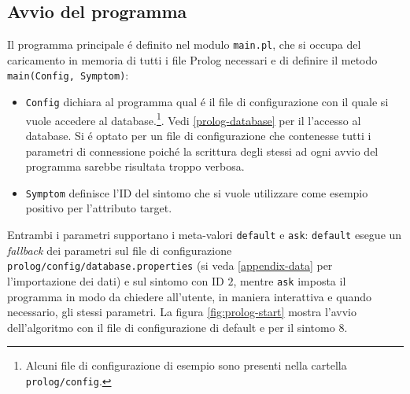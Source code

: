 \documentclass[preprint]{acm_proc_article-sp}
\begin{document}
\subsection{Avvio del programma}
\label{prolog-main}
Il programma principale \'e definito nel modulo \verb|main.pl|, che si occupa del caricamento in memoria di tutti i file Prolog necessari e di definire il metodo \verb|main(Config, Symptom)|:
\begin{itemize}
\item \verb|Config| dichiara al programma qual \'e il file di configurazione con il quale si vuole accedere al database.\footnote{Alcuni file di configurazione di esempio sono presenti nella cartella \texttt{prolog/config}.}. Vedi \ref{prolog-database} per il l'accesso al database. Si \'e optato per un file di configurazione che contenesse tutti i parametri di connessione poich\'e la scrittura degli stessi ad ogni avvio del programma sarebbe risultata troppo verbosa.
\item \verb|Symptom| definisce l'ID del sintomo che si vuole utilizzare come esempio positivo per l'attributo target.
\end{itemize}

Entrambi i parametri supportano i meta-valori \verb|default| e \verb|ask|: \verb|default| esegue un \textit{fallback} dei parametri sul file di configurazione \texttt{prolog/config/database.properties} (si veda \ref{appendix-data} per l'importazione dei dati) e sul sintomo con ID $2$, mentre \verb|ask| imposta il programma in modo da chiedere all'utente, in maniera interattiva e quando necessario, gli stessi parametri. La figura \ref{fig:prolog-start} mostra l'avvio dell'algoritmo con il file di configurazione di default e per il sintomo $8$.
\end{document}
